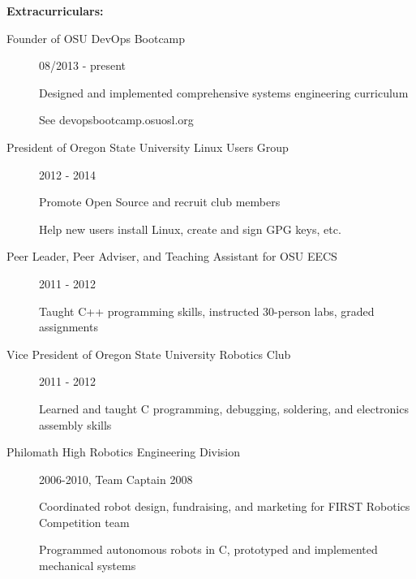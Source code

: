 \documentclass[11pt]{article}
\begin{document}
\smallskip
\hrulefill
\bigskip

{\Large \bf Extracurriculars:}
\begin{description}
    \item[Founder of OSU DevOps Bootcamp]
        \hfill 08/2013 - present
        
        Designed and implemented comprehensive systems engineering curriculum

        See devopsbootcamp.osuosl.org

    \item[President of Oregon State University Linux Users Group]
        \hfill 2012 - 2014

        Promote Open Source and recruit club members

        Help new users install Linux, create and sign GPG keys, etc.

    \item[Peer Leader, Peer Adviser, and Teaching Assistant for OSU EECS]
        \hfill 2011 - 2012

        Taught C++ programming skills, instructed 30-person labs, graded
        assignments

    \item[Vice President of Oregon State University Robotics Club]
        \hfill 2011 - 2012

        Learned and taught C programming, debugging, soldering, and electronics assembly skills

    \item[Philomath High Robotics Engineering Division]
        \hfill 2006-2010, Team Captain 2008

        Coordinated robot design, fundraising, and marketing for FIRST
        Robotics Competition team

        Programmed autonomous robots in C, prototyped and implemented
        mechanical systems

\end{description}
\end{document}
